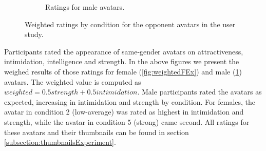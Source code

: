 \begin{figure}[H]
\begin{subfigure}[b]{0.4\textwidth}
         \caption{Ratings for male avatars.}
         \label{fig:weightedMEx}
     \end{subfigure}
      \hspace*{\fill}
     \caption{Weighted ratings by condition for the opponent avatars in the user study.}
         \label{fig:weightedEX}
\end{figure} 
Participants rated the appearance of same-gender avatars on attractiveness, intimidation, intelligence and strength. In the above  figures we present the weighed results of those ratings for female (\ref{fig:weightedFEx}) and male (\ref{fig:weightedMEx}) avatars. The weighted value is computed as $weighted=0.5strength+0.5intimidation$.
Male participants rated the avatars as expected, increasing in intimidation and strength by condition. For females, the avatar in condition 2 (low-average) was rated as highest in intimidation and strength, while the avatar in condition 5 (strong) came second. All ratings for these avatars and their thumbnails can be found in section \ref{subsection:thumbnailsExperiment}. 

